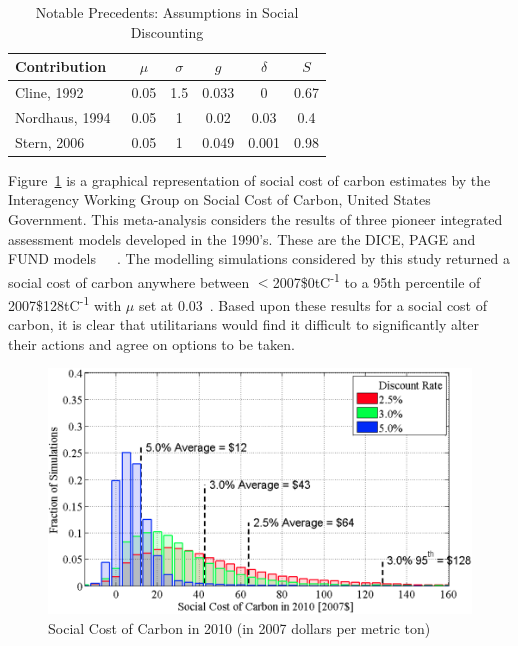 \documentclass[11pt, oneside]{book}   	%
\begin{document}
\begin{table}[H]
\caption{Notable Precedents: Assumptions in Social Discounting}
\begin{center}
\begin{tabular}{| l | c | c | c | c | c |}
\hline
Contribution&$\mu$&$\sigma$&$g$&$\delta$&$S$\\
\hline
Cline, 1992~\cite{wc1}&0.05&1.5&0.033&0&0.67 \\
Nordhaus, 1994~\cite{wn1}&0.05&1&0.02&0.03&0.4 \\
Stern, 2006~\cite{ns1}&0.05&1&0.049&0.001&0.98 \\
\hline
\end{tabular}
\end{center}
\label{Social contributions table}
\end{table}

Figure~\ref{USA SCC figure} is a graphical representation of social cost of carbon estimates by the Interagency Working Group on Social Cost of Carbon, United States Government.
This meta-analysis considers the results of three pioneer integrated assessment models developed in the 1990's.
These are the DICE, PAGE and FUND models~\cite{wn1}~\cite{ch1}~\cite{rsjt1}.
The modelling simulations considered by this study returned a social cost of carbon anywhere between $<$2007\$0tC\textsuperscript{-1} to a 95th percentile of 2007\$128tC\textsuperscript{-1} with $\mu$ set at 0.03~\cite{iwg1}. Based upon these results for a social cost of carbon, it is clear that utilitarians would find it difficult to significantly alter their actions and agree on options to be taken. 

\begin{figure}[H]
\centering
\includegraphics[width=1\textwidth]{scc}
\caption{Social Cost of Carbon in 2010 (in 2007 dollars per metric ton)}
\label{USA SCC figure}
\end{figure}
\end{document}
